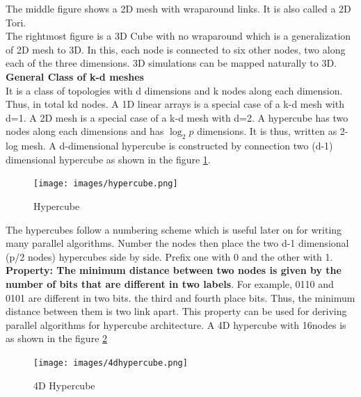 \documentclass[12pt]{book}
\begin{document}
The middle figure shows a 2D mesh with wraparound links. It is also called a 2D Tori.\\
The rightmost figure is a 3D Cube with no wraparound which is a generalization of 2D mesh to 3D. In this, each node is connected to six other nodes, 
two along each of the three dimensions. 3D simulations can be mapped naturally to 3D.\\
\textbf{General Class of k-d meshes}\\
It is a class of topologies with d dimensions and k nodes along each dimension. Thus, in total kd nodes.
A 1D linear arrays is a special case of a k-d mesh with d=1. A 2D mesh is a special case of a k-d mesh with d=2.
A hypercube has two nodes along each dimensions and has $\log_2 p$ dimensions. It is thus, written as 2-log mesh.
A d-dimensional hypercube is constructed by connection two (d-1) dimensional hypercube as shown in the figure \ref{fig:hypercube}.
\begin{figure}[H]
    \centering
    \texttt{[image: images/hypercube.png]}
    \caption{Hypercube}
    \label{fig:hypercube}
\end{figure}
The hypercubes follow a numbering scheme which is useful later on for writing many parallel algorithms. 
Number the nodes then place the two d-1 dimensional (p/2 nodes) hypercubes side by side. Prefix one with 0 and the other with 1.
\textbf{Property: The minimum distance between two nodes is given by the number of bits that are different in two labels}. For example,
0110 and 0101 are different in two bits. the third and fourth place bits. Thus, the minimum distance between them is two link apart. This property can 
be used for deriving parallel algorithms for hypercube architecture.
A 4D hypercube with 16nodes is as shown in the figure \ref{fig:4dhypercube}
\begin{figure}[H]
    \centering
    \texttt{[image: images/4dhypercube.png]}
    \caption{4D Hypercube}
    \label{fig:4dhypercube}
\end{figure}
\end{document}
